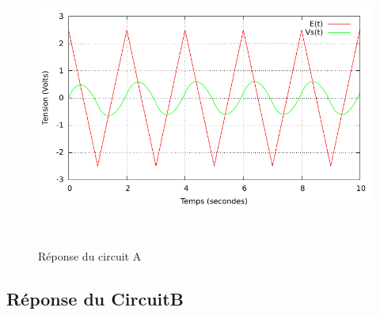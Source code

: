 \documentclass[a4paper,11pt]{article}
\begin{document}
\begin{figure}[h!]
\begin{minipage}[b]{0.5\linewidth}
   \end{minipage}
  \begin{minipage}[b]{0.5\linewidth}   
      \centering \includegraphics[scale=.68]{CAtriangle.pdf}
   \end{minipage}\\
 \caption{Réponse du circuit A}
\end{figure}

\newpage
  \subsection{Réponse du CircuitB}
\end{document}
